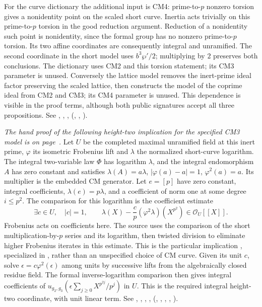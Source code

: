 For the curve dictionary the additional input is CM4: prime-to-$p$
nonzero torsion gives a nonidentity point on the scaled short curve.
Inertia acts trivially on this prime-to-$p$ torsion in the good
reduction argument. Reduction of a nonidentity such point is
nonidentity, since the formal group has no nonzero prime-to-$p$
torsion. Its two affine coordinates are consequently integral and
unramified. The second coordinate in the short model uses
$b^3\wp'/2$; multiplying by $2$ preserves both conclusions. The
dictionary uses CM2 and this torsion statement; its CM3 parameter is
unused. Conversely the lattice model removes the inert-prime ideal
factor preserving the scaled lattice, then constructs the model of
the coprime ideal from CM2 and CM3; its CM4 parameter is unused.
This dependence is visible in the proof terms, although both public
signatures accept all three propositions. See ,
, , 
(, ,
).

\emph{The hand proof of the following height-two implication for the specified CM3 model is on page~\pageref{r9:Z4.3}.}
Let $U$ be the completed maximal unramified field at this inert
prime, $\varphi$ its isometric Frobenius lift and $\lambda$ the
normalized short-curve logarithm. The integral two-variable law
$\Phi$ has logarithm $\lambda$, and the integral endomorphism $A$
has zero constant and satisfies $\lambda(A)=a\lambda$,
$|\varphi(a)-a|=1$, $\varphi^2(a)=a$. Its multiplier is the
embedded CM generator. Let $e=[p]$ have zero constant, integral
coefficients, $\lambda(e)=p\lambda$, and a coefficient of norm one
at some degree $i\le p^2$. The comparison for this logarithm is the coefficient estimate
\[
 \exists c\in U,\quad |c|=1,\qquad
 \lambda(X)-\frac{c}{p}(\varphi^2\lambda)(X^{p^2})
       \in\mathcal O_U[[X]] .
\]
Frobenius acts on coefficients here. The source uses the comparison
of the short multiplication-by-$p$ series and its logarithm, then
twisted division to eliminate higher Frobenius iterates in this
estimate. This is the particular implication ,
specialized in , rather than an unspecified choice of CM
curve. Given its unit $c$, solve $\epsilon=c\varphi^2(\epsilon)$
among units by successive lifts from the algebraically closed residue
field. The formal inverse-logarithm comparison then gives integral
coefficients of
$u_{g_2,g_3}(\epsilon\sum_{j\ge0}X^{p^{2j}}/p^j)$ in $U$.
This is the required integral height-two coordinate, with unit linear
term. See , , ,
, 
(, , ,
, ).

